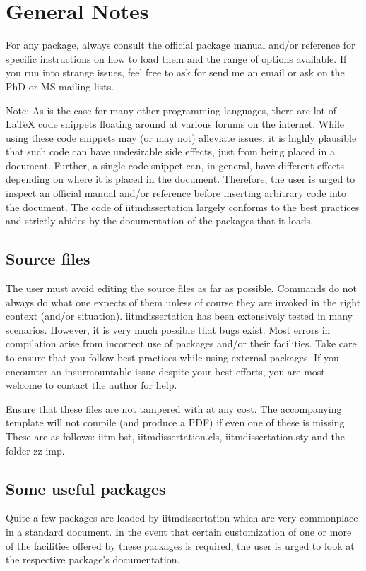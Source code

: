 \chapter{General Notes}
For any package, always consult the official package manual and/or reference
for specific instructions on how to load them and the range of options
available. If you run into strange issues, feel free to ask for send
me an email or ask on the PhD or MS mailing lists.

{Note:} As is the case for many other programming languages, there are
lot of {\LaTeX} code snippets floating around at various forums on the
internet. While using these code snippets may (or may not) alleviate issues,
it is highly plausible that such code can have undesirable side effects, just
from being placed in a document. Further, a single code snippet can, in general,
have different effects depending on where it is placed in the document.
Therefore, the user is urged to inspect an official manual and/or reference
before inserting arbitrary code into the document. The code of
{iitmdissertation} largely conforms to the best practices and strictly
abides by the documentation of the packages that it loads.

\section{Source files} \label{sec:source-files}
The user must avoid editing the source files as far as possible. Commands do
not always do what one expects of them unless of course they are invoked in the
right context (and/or situation). {\ttfamily iitmdissertation} has been extensively
tested in many scenarios. However, it is very much possible that bugs exist.
Most errors in compilation arise from incorrect use of packages and/or their
facilities. Take care to ensure that you follow best practices while using
external packages. If you encounter an insurmountable issue despite your best
efforts, you are most welcome to contact the author for help.

Ensure that these files are not tampered with at any cost. The accompanying
template will not compile (and produce a PDF) if even one of these is missing. 
These are as follows: {\ttfamily iitm.bst}, {\ttfamily iitmdissertation.cls}, 
{\ttfamily iitmdissertation.sty} and the folder {\ttfamily zz-imp}.

\section{Some useful packages}
Quite a few packages are loaded by {iitmdissertation} which are very
commonplace in a standard document. In the event that certain customization of
one or more of the facilities offered by these packages is required, the user
is urged to look at the respective package's documentation.

